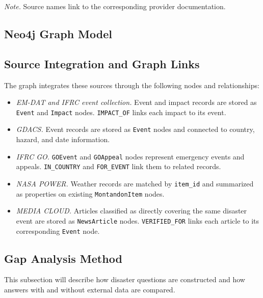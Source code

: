\documentclass[11pt]{article}
\begin{document}
\par\medskip
\noindent\emph{Note.} Source names link to
the corresponding provider documentation.
\par
\endgroup


\subsection{Neo4j Graph Model}

\subsection{Source Integration and Graph Links}

The graph integrates these sources through the following nodes and relationships:

{\small
\setlength{\leftmargini}{1.5em}
\begin{itemize}
    \setlength{\itemsep}{0.45em}
    \setlength{\parsep}{0pt}

    \item \emph{EM-DAT and IFRC event collection.}
    Event and impact records are stored as \texttt{Event} and
    \texttt{Impact} nodes. \texttt{IMPACT\_OF} links each impact
    to its event.

    \item \emph{GDACS.}
    Event records are stored as \texttt{Event} nodes and connected
    to country, hazard, and date information.

    \item \emph{IFRC GO.}
    \texttt{GOEvent} and \texttt{GOAppeal} nodes represent emergency
    events and appeals. \texttt{IN\_COUNTRY} and
    \texttt{FOR\_EVENT} link them to related records.

    \item \emph{NASA POWER.}
    Weather records are matched by \texttt{item\_id} and summarized
    as properties on existing \texttt{MontandonItem} nodes.

    \item \emph{MEDIA CLOUD.}
    Articles classified as directly covering the same disaster
    event are stored as \texttt{NewsArticle} nodes.
    \texttt{VERIFIED\_FOR} links each article to its
    corresponding \texttt{Event} node.
\end{itemize}
}

\subsection{Gap Analysis Method}
This subsection will describe how disaster questions are constructed and how answers with and without external data are compared.
\end{document}
